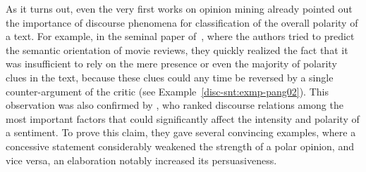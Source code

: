 

As it turns out, even the very first works on opinion mining already
pointed out the importance of discourse phenomena for classification
of the overall polarity of a text.  For example, in the seminal paper
of~, where the authors tried to predict the semantic
orientation of movie reviews, they quickly realized the fact that it
was insufficient to rely on the mere presence or even the majority of
polarity clues in the text, because these clues could any time be
reversed by a single counter-argument of the critic (see
Example~\ref{disc-snt:exmp-pang02}).  This observation was also
confirmed by , who ranked discourse relations among
the most important factors that could significantly affect the
intensity and polarity of a sentiment.  To prove this claim, they gave
several convincing examples, where a concessive statement considerably
weakened the strength of a polar opinion, and vice versa, an
elaboration notably increased its persuasiveness.

